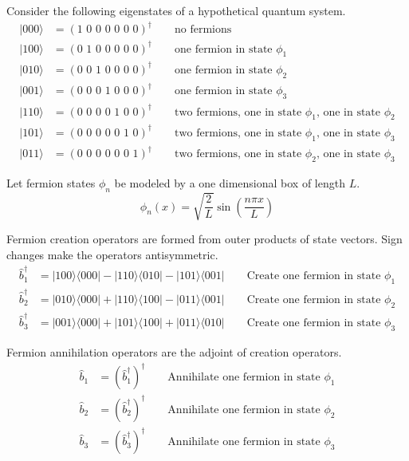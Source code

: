 \documentclass[12pt]{article}
\begin{document}
\noindent
Consider the following eigenstates of a hypothetical quantum system.
\begin{align*}
|000\rangle&=(\text{1 0 0 0 0 0 0})^\dag\qquad\text{no fermions}\\
|100\rangle&=(\text{0 1 0 0 0 0 0})^\dag\qquad\text{one fermion in state $\phi_1$}\\
|010\rangle&=(\text{0 0 1 0 0 0 0})^\dag\qquad\text{one fermion in state $\phi_2$}\\
|001\rangle&=(\text{0 0 0 1 0 0 0})^\dag\qquad\text{one fermion in state $\phi_3$}\\
|110\rangle&=(\text{0 0 0 0 1 0 0})^\dag\qquad\text{two fermions, one in state $\phi_1$, one in state $\phi_2$}\\
|101\rangle&=(\text{0 0 0 0 0 1 0})^\dag\qquad\text{two fermions, one in state $\phi_1$, one in state $\phi_3$}\\
|011\rangle&=(\text{0 0 0 0 0 0 1})^\dag\qquad\text{two fermions, one in state $\phi_2$, one in state $\phi_3$}
\end{align*}

\noindent
Let fermion states $\phi_n$ be modeled by a one dimensional box of length $L$.
\begin{equation*}
\phi_n(x)=\sqrt{\frac{2}{L}}\sin\left(\frac{n\pi x}{L}\right)
\end{equation*}

\noindent
Fermion creation operators are formed from outer products of state vectors.
Sign changes make the operators antisymmetric.
\begin{align*}
\hat{b}_1^\dag&=|100\rangle\langle000|-|110\rangle\langle010|-|101\rangle\langle001|
\qquad\text{Create one fermion in state $\phi_1$}\\
\hat{b}_2^\dag&=|010\rangle\langle000|+|110\rangle\langle100|-|011\rangle\langle001|
\qquad\text{Create one fermion in state $\phi_2$}\\
\hat{b}_3^\dag&=|001\rangle\langle000|+|101\rangle\langle100|+|011\rangle\langle010|
\qquad\text{Create one fermion in state $\phi_3$}
\end{align*}

\noindent
Fermion annihilation operators are the adjoint of creation operators.
\begin{align*}
\hat{b}_1&=(\hat{b}_1^\dag)^\dag\qquad\text{Annihilate one fermion in state $\phi_1$}\\
\hat{b}_2&=(\hat{b}_2^\dag)^\dag\qquad\text{Annihilate one fermion in state $\phi_2$}\\
\hat{b}_3&=(\hat{b}_3^\dag)^\dag\qquad\text{Annihilate one fermion in state $\phi_3$}
\end{align*}
\end{document}
